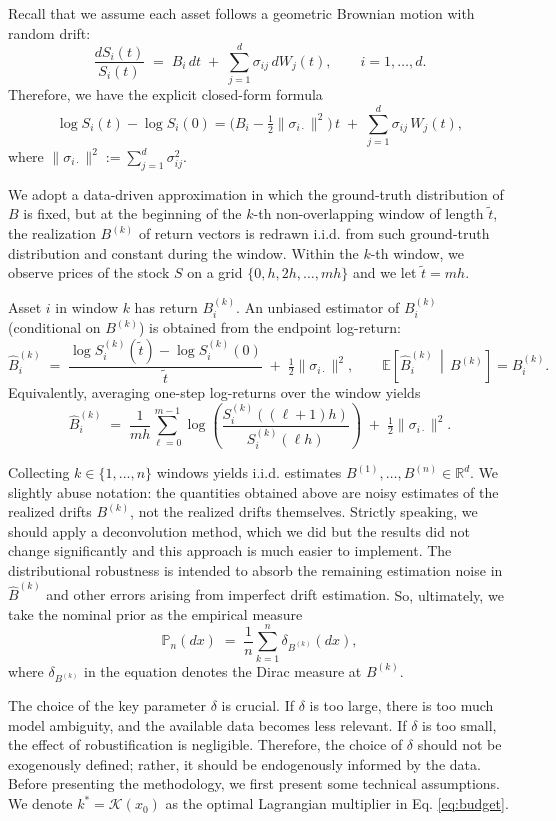 \documentclass[11pt]{article}
\theoremstyle{definition}
\begin{document}
Recall that we assume each asset follows a geometric Brownian motion with random drift:
\[
\frac{dS_i(t)}{S_i(t)} \;=\; B_i\,dt \;+\; \sum_{j=1}^d \sigma_{ij}\,dW_j(t),
\qquad i=1,\dots,d.
\]
Therefore, we have the explicit closed-form formula
\[
\log S_i(t)-\log S_i(0)
= \Big(B_i-\tfrac12\|\sigma_{i\cdot}\|^2\Big)\,t
\;+\;\sum_{j=1}^d \sigma_{ij}\,W_j(t),
\]
where $\|\sigma_{i\cdot}\|^2:=\sum_{j=1}^d \sigma_{ij}^2$.

We adopt a data-driven approximation in which the ground-truth distribution of $B$ is fixed, but at the beginning of the $k$-th non-overlapping window of length $\tilde t$, the realization $B^{(k)}$ of return vectors is redrawn i.i.d. from such ground-truth distribution and constant during the window. Within the $k$-th window, we observe prices of the stock $S$ on a grid $\{0,h,2h,\dots,mh\}$ and we let $\tilde t = mh$. 

Asset $i$ in window $k$ has return $B_i^{(k)}$. An unbiased estimator of $B_i^{(k)}$ (conditional on $B^{(k)}$) is obtained from the endpoint log-return:
\[
\widehat B^{(k)}_i
\;=\;
\frac{\log S_i^{(k)}(\tilde t)-\log S_i^{(k)}(0)}{\tilde t}
\;+\;\tfrac12\|\sigma_{i\cdot}\|^2,
\qquad
\mathbb E\!\left[\widehat B^{(k)}_i \,\middle|\, B^{(k)}\right]=B^{(k)}_i.
\]
Equivalently, averaging one-step log-returns over the window yields
\[
\widehat B^{(k)}_i
\;=\;
\frac{1}{mh}\sum_{\ell=0}^{m-1}
\log\!\left(\frac{S_i^{(k)}((\ell+1)h)}{S_i^{(k)}(\ell h )}\right)
\;+\;\tfrac12\|\sigma_{i\cdot}\|^2.
\]

Collecting  $k \in \{1,...,n\}$ windows yields i.i.d. estimates $ B^{(1)},\dots,B^{(n)}\in\mathbb R^d$. %
We slightly abuse notation: the quantities obtained above are noisy estimates of the realized drifts \(B^{(k)}\), not the realized drifts themselves. 
Strictly speaking, we should apply a deconvolution method, which we did but the results did not change significantly and this approach is much easier to implement. 
{The distributional robustness is intended to absorb the remaining estimation noise in
\(\widehat B^{(k)}\) and other errors arising from imperfect drift estimation.} So, ultimately, we take the nominal prior as the empirical measure
\[
\mathbb P_n(dx) \;=\; \frac{1}{n}\sum_{k=1}^n \delta_{B^{(k)}}(dx),
\]
{where $\delta_{B^{(k)}}$ in the equation denotes the Dirac measure at $ B^{(k)}$.}

The choice of the key parameter $\delta$ is crucial. If $\delta$ is too large, there is too much model ambiguity, and the available data becomes less relevant. If $\delta$ is too small, the effect of robustification is negligible. Therefore, the choice of $\delta$ should not be exogenously defined; rather, it should be endogenously informed by the data. Before presenting the methodology, we first present some technical assumptions. We denote $k^* = \mathcal{K}(x_0)$ as the optimal Lagrangian multiplier in Eq. \eqref{eq:budget}.
\end{document}
